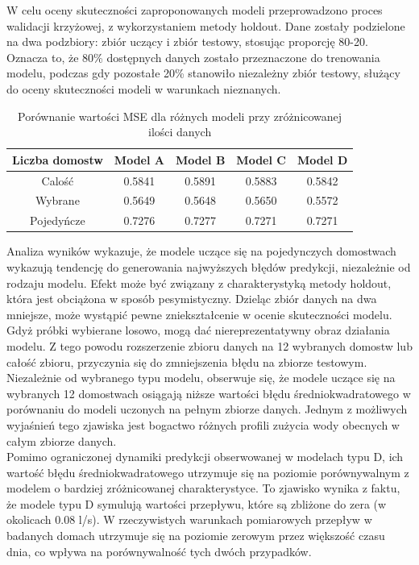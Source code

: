 \documentclass[a4paper,twoside,12pt]{book}
\begin{document}
W celu oceny skuteczności zaproponowanych modeli przeprowadzono proces walidacji krzyżowej, z wykorzystaniem metody holdout. Dane zostały podzielone na dwa podzbiory: zbiór uczący i zbiór testowy, stosując proporcję 80-20. Oznacza to, że 80\% dostępnych danych zostało przeznaczone do trenowania modelu, podczas gdy pozostałe 20\% stanowiło niezależny zbiór testowy, służący do oceny skuteczności modeli w warunkach nieznanych.
\begin{table}[!h]
  \centering
  \renewcommand{\arraystretch}{1.5}
  \caption{Porównanie wartości MSE dla różnych modeli przy zróżnicowanej ilości danych}
  \begin{tabular}{|c|c|c|c|c|}
    \hline
    Liczba domostw & Model A & Model B & Model C & Model D \\ \hline
    Calość         & 0.5841  & 0.5891  & 0.5883  & 0.5842  \\ \hline
    Wybrane        & 0.5649  & 0.5648  & 0.5650  & 0.5572  \\ \hline
    Pojedyńcze     & 0.7276  & 0.7277  & 0.7271  & 0.7271  \\ \hline
  \end{tabular}
\end{table}

Analiza wyników wykazuje, że modele uczące się na pojedynczych domostwach wykazują tendencję do generowania najwyższych błędów predykcji, niezależnie od rodzaju modelu. Efekt może być związany z charakterystyką metody holdout, która jest obciążona w sposób pesymistyczny. Dzieląc zbiór danych na dwa mniejsze,  może wystąpić pewne zniekształcenie w ocenie skuteczności modelu. Gdyż próbki wybierane losowo, mogą dać niereprezentatywny obraz działania modelu. Z tego powodu rozszerzenie zbioru danych na 12 wybranych domostw lub całość zbioru, przyczynia się do zmniejszenia błędu na zbiorze testowym.\\

Niezależnie od wybranego typu modelu, obserwuje się, że modele uczące się na wybranych 12 domostwach osiągają niższe wartości błędu średniokwadratowego w porównaniu do modeli uczonych na pełnym zbiorze danych. Jednym z możliwych wyjaśnień tego zjawiska jest bogactwo różnych profili zużycia wody obecnych w całym zbiorze danych.\\

Pomimo ograniczonej dynamiki predykcji obserwowanej w modelach typu D, ich wartość błędu średniokwadratowego utrzymuje się na poziomie porównywalnym z modelem o bardziej zróżnicowanej charakterystyce. To zjawisko wynika z faktu, że modele typu D symulują wartości przepływu, które są zbliżone do zera (w okolicach 0.08 l/s). W rzeczywistych warunkach pomiarowych przepływ w badanych domach utrzymuje się na poziomie zerowym przez większość czasu dnia, co wpływa na porównywalność tych dwóch przypadków.\\
\end{document}
